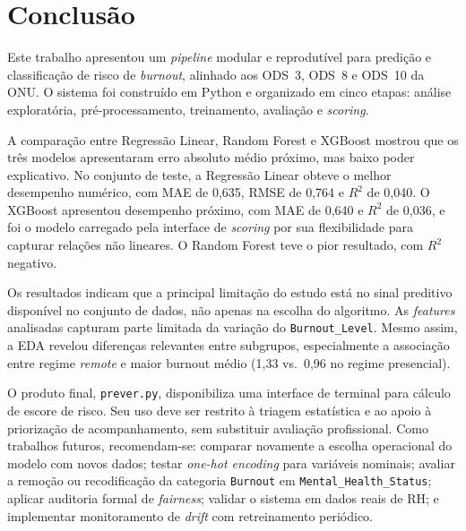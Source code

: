 \documentclass[conference]{IEEEtran}
\begin{document}
\section{Conclusão}
\label{sec:conc}

Este trabalho apresentou um \textit{pipeline} modular e reprodutível para
predição e classificação de risco de \textit{burnout}, alinhado aos ODS~3,
ODS~8 e ODS~10 da ONU. O sistema foi construído em Python e organizado em
cinco etapas: análise exploratória, pré-processamento, treinamento,
avaliação e \textit{scoring}.

A comparação entre Regressão Linear, Random Forest e XGBoost mostrou que
os três modelos apresentaram erro absoluto médio próximo, mas baixo poder
explicativo. No conjunto de teste, a Regressão Linear obteve o melhor
desempenho numérico, com MAE de 0,635, RMSE de 0,764 e $R^2$ de 0,040. O
XGBoost apresentou desempenho próximo, com MAE de 0,640 e $R^2$ de 0,036, e
foi o modelo carregado pela interface de \textit{scoring} por sua flexibilidade
para capturar relações não lineares. O Random Forest teve o pior resultado,
com $R^2$ negativo.

Os resultados indicam que a principal limitação do estudo está no sinal
preditivo disponível no conjunto de dados, não apenas na escolha do
algoritmo. As \textit{features} analisadas capturam parte limitada da
variação do \texttt{Burnout_Level}. Mesmo assim, a EDA revelou diferenças
relevantes entre subgrupos, especialmente a associação entre regime
\textit{remote} e maior burnout médio (1,33 vs.\ 0,96 no regime presencial).

O produto final, \texttt{prever.py}, disponibiliza uma interface de terminal
para cálculo de escore de risco. Seu uso deve ser restrito à triagem
estatística e ao apoio à priorização de acompanhamento, sem substituir
avaliação profissional. Como trabalhos futuros, recomendam-se: comparar
novamente a escolha operacional do modelo com novos dados; testar
\textit{one-hot encoding} para variáveis nominais; avaliar a remoção ou
recodificação da categoria \texttt{Burnout} em
\texttt{Mental_Health_Status}; aplicar auditoria formal de
\textit{fairness}; validar o sistema em dados reais de RH; e implementar
monitoramento de \textit{drift} com retreinamento periódico.
\end{document}

